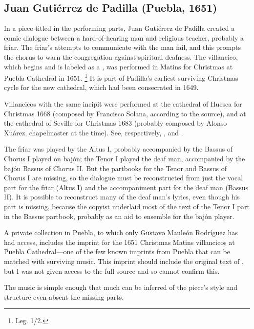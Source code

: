 \subsection{Juan Gutiérrez de Padilla (Puebla, 1651)}

In a piece titled  in the performing parts, Juan Gutiérrez de Padilla created a comic dialogue between a hard-of-hearing man and religious teacher, probably a friar.
The friar's attempts to communicate with the  man fail, and this prompts the chorus to warn the congregation against spiritual deafness.
The villancico, which begins  and is labeled as a , was performed in Matins for Christmas at Puebla Cathedral in 1651.%
  \footnote{\signature{MEX-Pc}{Leg. 1/2}.}
It is part of Padilla's earliest surviving Christmas cycle for the new cathedral, which had been consecrated in 1649.%
  \begin{Footnote}
  Villancicos with the same incipit were performed at the cathedral of Huesca for Christmas 1668 (composed by Francisco Solana, according to the source), and at the cathedral of Seville for Christmas 1683 (probably composed by Alonso Xuárez, chapelmaster at the time).
  See, respectively, \autocite[1685, cat. no. 424]{BNE:VCs17C}, and \autocite[46--47, cat. no. 45]{UK:VCs}.\XXX{}
  \end{Footnote}

The friar was played by the Altus I, probably accompanied by the Bassus of Chorus I played on bajón; the Tenor I played the deaf man, accompanied by the bajón Bassus of Chorus II.
But the partbooks for the Tenor and Bassus of Chorus I are missing, so the dialogue must be reconstructed from just the vocal part for the friar (Altus I) and the accompaniment part for the deaf man (Bassus II).
It is possible to reconstruct many of the deaf man's lyrics, even though his part is missing, because the copyist underlaid most of the text of the Tenor I  part in the Bassus partbook, probably as an aid to ensemble for the bajón player.
  \begin{Footnote}
  A private collection in Puebla, to which only Gustavo Mauleón Rodríguez has had access, includes the imprint for the 1651 Christmas Matins villancicos at Puebla Cathedral---one of the few known imprints from Puebla that can be matched with surviving music.
  This imprint should include the original text of , but I was not given access to the full source and so cannot confirm this.\XXX{}
  \end{Footnote}
The music is simple enough that much can be inferred of the piece's style and structure even absent the missing parts.

